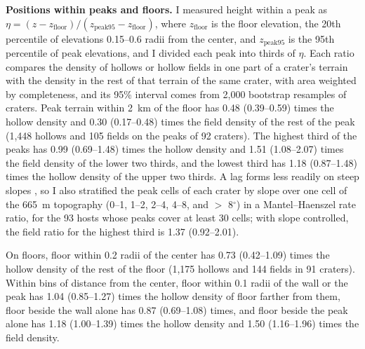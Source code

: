 \documentclass{planetary}
\begin{document}
\textbf{Positions within peaks and floors.} I measured height within a peak as $\eta = (z - z_\mathrm{floor})/(z_\mathrm{peak95} - z_\mathrm{floor})$, where $z_\mathrm{floor}$ is the floor elevation, the 20th percentile of elevations 0.15--0.6 radii from the center, and $z_\mathrm{peak95}$ is the 95th percentile of peak elevations, and I divided each peak into thirds of $\eta$. Each ratio compares the density of hollows or hollow fields in one part of a crater's terrain with the density in the rest of that terrain of the same crater, with area weighted by completeness, and its 95\% interval comes from 2,000 bootstrap resamples of craters. Peak terrain within 2~km of the floor has 0.48 (0.39--0.59) times the hollow density and 0.30 (0.17--0.48) times the field density of the rest of the peak (1,448 hollows and 105 fields on the peaks of 92 craters). The highest third of the peaks has 0.99 (0.69--1.48) times the hollow density and 1.51 (1.08--2.07) times the field density of the lower two thirds, and the lowest third has 1.18 (0.87--1.48) times the hollow density of the upper two thirds. A lag forms less readily on steep slopes \parencite{blewett2016}, so I also stratified the peak cells of each crater by slope over one cell of the 665~m topography (0--1, 1--2, 2--4, 4--8, and $>$ 8$^\circ$) in a Mantel--Haenszel rate ratio, for the 93 hosts whose peaks cover at least 30 cells; with slope controlled, the field ratio for the highest third is 1.37 (0.92--2.01).

On floors, floor within 0.2 radii of the center has 0.73 (0.42--1.09) times the hollow density of the rest of the floor (1,175 hollows and 144 fields in 91 craters). Within bins of distance from the center, floor within 0.1 radii of the wall or the peak has 1.04 (0.85--1.27) times the hollow density of floor farther from them, floor beside the wall alone has 0.87 (0.69--1.08) times, and floor beside the peak alone has 1.18 (1.00--1.39) times the hollow density and 1.50 (1.16--1.96) times the field density.
\end{document}
